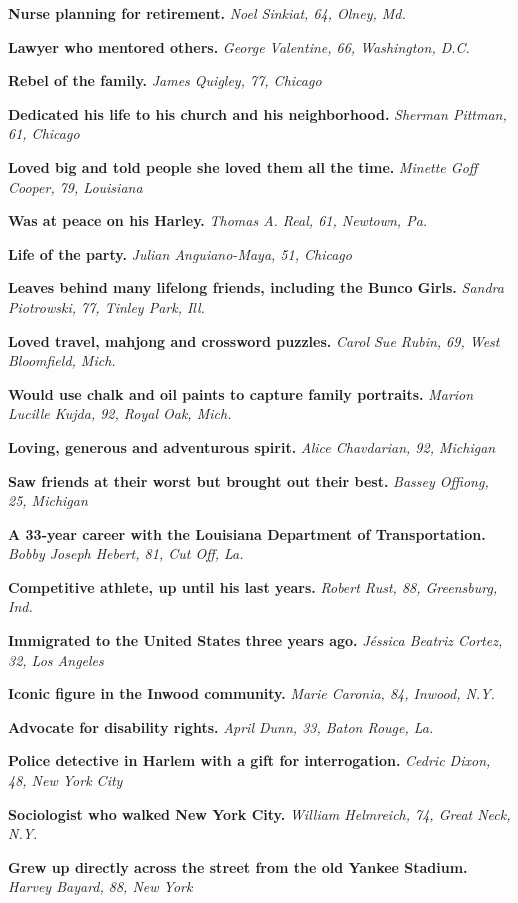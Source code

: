 \textbf{Nurse planning for retirement.} \emph{Noel Sinkiat, 64, Olney,
Md.}

\textbf{Lawyer who mentored others.} \emph{George Valentine, 66,
Washington, D.C.}

\textbf{Rebel of the family.} \emph{James Quigley, 77, Chicago}

\textbf{Dedicated his life to his church and his neighborhood.}
\emph{Sherman Pittman, 61, Chicago}

\textbf{Loved big and told people she loved them all the time.}
\emph{Minette Goff Cooper, 79, Louisiana}

\textbf{Was at peace on his Harley.} \emph{Thomas A. Real, 61, Newtown,
Pa.}

\textbf{Life of the party.} \emph{Julian Anguiano-Maya, 51, Chicago}

\textbf{Leaves behind many lifelong friends, including the Bunco Girls.}
\emph{Sandra Piotrowski, 77, Tinley Park, Ill.}

\textbf{Loved travel, mahjong and crossword puzzles.} \emph{Carol Sue
Rubin, 69, West Bloomfield, Mich.}

\textbf{Would use chalk and oil paints to capture family portraits.}
\emph{Marion Lucille Kujda, 92, Royal Oak, Mich.}

\textbf{Loving, generous and adventurous spirit.} \emph{Alice
Chavdarian, 92, Michigan}

\textbf{Saw friends at their worst but brought out their best.}
\emph{Bassey Offiong, 25, Michigan}

\textbf{A 33-year career with the Louisiana Department of
Transportation.} \emph{Bobby Joseph Hebert, 81, Cut Off, La.}

\textbf{Competitive athlete, up until his last years.} \emph{Robert
Rust, 88, Greensburg, Ind.}

\textbf{Immigrated to the United States three years ago.} \emph{Jéssica
Beatriz Cortez, 32, Los Angeles}

\textbf{Iconic figure in the Inwood community.} \emph{Marie Caronia, 84,
Inwood, N.Y.}

\textbf{Advocate for disability rights.} \emph{April Dunn, 33, Baton
Rouge, La.}

\textbf{Police detective in Harlem with a gift for interrogation.}
\emph{Cedric Dixon, 48, New York City}

\textbf{Sociologist who walked New York City.} \emph{William Helmreich,
74, Great Neck, N.Y.}

\textbf{Grew up directly across the street from the old Yankee Stadium.}
\emph{Harvey Bayard, 88, New York}


